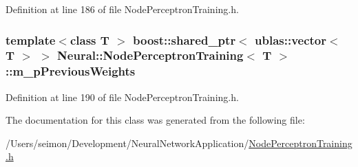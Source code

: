 Definition at line 186 of file NodePerceptronTraining.h.

\hypertarget{class_neural_1_1_node_perceptron_training_ae97af6f6af980d423607e1ad69847216}{
\subsubsection[{m\_\-pPreviousWeights}]{\setlength{\rightskip}{0pt plus 5cm}template$<$class T $>$ boost::shared\_\-ptr$<$ ublas::vector$<$ T $>$ $>$ {\bf Neural::NodePerceptronTraining}$<$ T $>$::{\bf m\_\-pPreviousWeights}}}
\label{class_neural_1_1_node_perceptron_training_ae97af6f6af980d423607e1ad69847216}


Definition at line 190 of file NodePerceptronTraining.h.



The documentation for this class was generated from the following file:\begin{DoxyCompactItemize}
\item 
/Users/seimon/Development/NeuralNetworkApplication/\hyperlink{_node_perceptron_training_8h}{NodePerceptronTraining.h}\end{DoxyCompactItemize}
